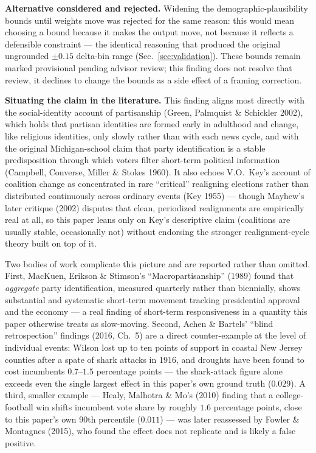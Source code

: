 \documentclass[11pt]{article}
\begin{document}
\textbf{Alternative considered and rejected.} Widening the
demographic-plausibility bounds until weights move was rejected for the same
reason: this would mean choosing a bound because it makes the output move,
not because it reflects a defensible constraint --- the identical reasoning
that produced the original ungrounded $\pm0.15$ delta-bin range
(Sec.~\ref{sec:validation}). These bounds remain marked provisional pending
advisor review; this finding does not resolve that review, it declines to
change the bounds as a side effect of a framing correction.

\textbf{Situating the claim in the literature.} This finding aligns most
directly with the social-identity account of partisanship (Green, Palmquist
\& Schickler 2002), which holds that partisan identities are formed early
in adulthood and change, like religious identities, only slowly rather than
with each news cycle, and with the original Michigan-school claim that party
identification is a stable predisposition through which voters filter
short-term political information (Campbell, Converse, Miller \& Stokes
1960). It also echoes V.O.\ Key's account of coalition change as
concentrated in rare ``critical'' realigning elections rather than
distributed continuously across ordinary events (Key 1955) --- though
Mayhew's later critique (2002) disputes that clean, periodized realignments
are empirically real at all, so this paper leans only on Key's descriptive
claim (coalitions are usually stable, occasionally not) without endorsing
the stronger realignment-cycle theory built on top of it.

Two bodies of work complicate this picture and are reported rather than
omitted. First, MacKuen, Erikson \& Stimson's ``Macropartisanship'' (1989)
found that \emph{aggregate} party identification, measured quarterly rather
than biennially, shows substantial and systematic short-term movement
tracking presidential approval and the economy --- a real finding of
short-term responsiveness in a quantity this paper otherwise treats as
slow-moving. Second, Achen \& Bartels' ``blind retrospection'' findings
(2016, Ch.~5) are a direct counter-example at the level of individual
events: Wilson lost up to ten points of support in coastal New Jersey
counties after a spate of shark attacks in 1916, and droughts have been
found to cost incumbents $0.7$--$1.5$ percentage points --- the shark-attack
figure alone exceeds even the single largest effect in this paper's own
ground truth ($0.029$). A third, smaller example --- Healy, Malhotra \&
Mo's (2010) finding that a college-football win shifts incumbent vote share
by roughly $1.6$ percentage points, close to this paper's own 90th
percentile ($0.011$) --- was later reassessed by Fowler \& Montagnes (2015),
who found the effect does not replicate and is likely a false positive.
\end{document}

